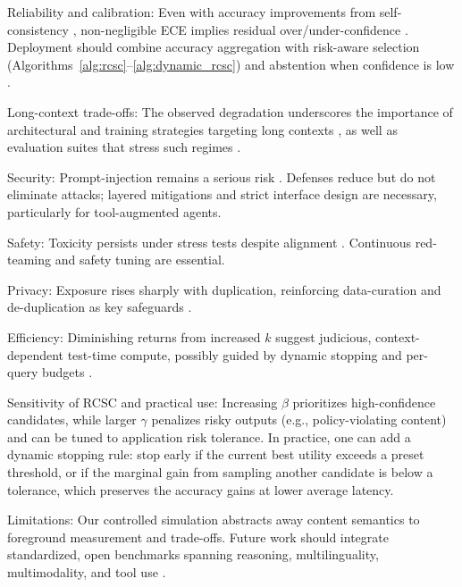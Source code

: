 \documentclass[10pt]{article}
\begin{document}
Reliability and calibration: Even with accuracy improvements from self-consistency \citep{Wang2023SelfConsistency}, non-negligible ECE implies residual over/under-confidence \citep{Guo2017Calibration, Desai2020Calibration}. Deployment should combine accuracy aggregation with risk-aware selection (Algorithms~\ref{alg:rcsc}--\ref{alg:dynamic_rcsc}) and abstention when confidence is low \citep{Kadavath2022KnowWhatKnow, Geifman2017Selective}.

Long-context trade-offs: The observed degradation underscores the importance of architectural and training strategies targeting long contexts \citep{Rae2021Gopher, Press2021ALiBi, Su2021RoFormer}, as well as evaluation suites that stress such regimes \citep{Liang2022HELM, Liu2023LostInTheMiddle}.

Security: Prompt-injection remains a serious risk \citep{Perez2022RedTeam, Greshake2023IndirectPromptInjection}. Defenses reduce but do not eliminate attacks; layered mitigations and strict interface design are necessary, particularly for tool-augmented agents.

Safety: Toxicity persists under stress tests despite alignment \citep{Bai2022ConstitutionalAI, Weidinger2021EthicalRisks, Gehman2020RealToxicity}. Continuous red-teaming and safety tuning are essential.

Privacy: Exposure rises sharply with duplication, reinforcing data-curation and de-duplication as key safeguards \citep{Carlini2021ExtractingTrainingData, Carlini2023PoisoningWebScale, Lee2022Dedup}.

Efficiency: Diminishing returns from increased $k$ suggest judicious, context-dependent test-time compute, possibly guided by dynamic stopping and per-query budgets \citep{Xin2020DeeBERT}.

Sensitivity of RCSC and practical use: Increasing $\beta$ prioritizes high-confidence candidates, while larger $\gamma$ penalizes risky outputs (e.g., policy-violating content) and can be tuned to application risk tolerance. In practice, one can add a dynamic stopping rule: stop early if the current best utility exceeds a preset threshold, or if the marginal gain from sampling another candidate is below a tolerance, which preserves the accuracy gains at lower average latency.

Limitations: Our controlled simulation abstracts away content semantics to foreground measurement and trade-offs. Future work should integrate standardized, open benchmarks spanning reasoning, multilinguality, multimodality, and tool use \citep{Liang2022HELM, Kiela2021Dynabench}.
\end{document}
